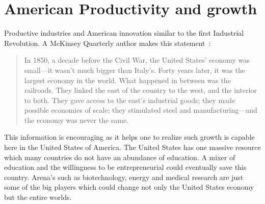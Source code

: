 \documentclass[pdflatex,12pt,a4paper]{report}
\begin{document}
\section{American Productivity and growth}
\begin{doublespace}
Productive industries and American innovation similar to the first Industrial Revolution. A McKinsey Quarterly author makes this statement~\cite{arthur2011second}:
\end{doublespace}
\begin{quotation}
In 1850, a decade before the Civil War, the United States’ economy
was small—it wasn’t much bigger than Italy’s. Forty years later, it was
the largest economy in the world. What happened in between was
the railroads. They linked the east of the country to the west, and the
interior to both. They gave access to the east’s industrial goods;
they made possible economies of scale; they stimulated steel and
manufacturing—and the economy was never the same.
\end{quotation}
\begin{doublespace}
This information is encouraging as it helps one to realize such growth is capable here in the United States of America. The United States has one massive resource which many countries do not have an abundance of education. A mixer of education and the willingness to be entrepreneurial could eventually save this country. Arena's such as biotechnology, energy and medical research are just some of the big players which could change not only the United States economy but the entire worlds.       
\end{doublespace}

\clearpage
    \nocite{*}
    
    
\end{document}
